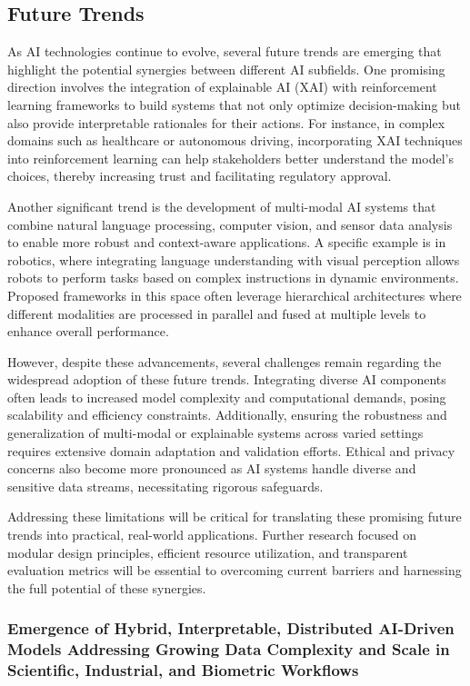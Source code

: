 \documentclass[sigconf]{acmart}
\begin{document}
\subsection{Future Trends}

As AI technologies continue to evolve, several future trends are emerging that highlight the potential synergies between different AI subfields. One promising direction involves the integration of explainable AI (XAI) with reinforcement learning frameworks to build systems that not only optimize decision-making but also provide interpretable rationales for their actions. For instance, in complex domains such as healthcare or autonomous driving, incorporating XAI techniques into reinforcement learning can help stakeholders better understand the model's choices, thereby increasing trust and facilitating regulatory approval.

Another significant trend is the development of multi-modal AI systems that combine natural language processing, computer vision, and sensor data analysis to enable more robust and context-aware applications. A specific example is in robotics, where integrating language understanding with visual perception allows robots to perform tasks based on complex instructions in dynamic environments. Proposed frameworks in this space often leverage hierarchical architectures where different modalities are processed in parallel and fused at multiple levels to enhance overall performance.

However, despite these advancements, several challenges remain regarding the widespread adoption of these future trends. Integrating diverse AI components often leads to increased model complexity and computational demands, posing scalability and efficiency constraints. Additionally, ensuring the robustness and generalization of multi-modal or explainable systems across varied settings requires extensive domain adaptation and validation efforts. Ethical and privacy concerns also become more pronounced as AI systems handle diverse and sensitive data streams, necessitating rigorous safeguards.

Addressing these limitations will be critical for translating these promising future trends into practical, real-world applications. Further research focused on modular design principles, efficient resource utilization, and transparent evaluation metrics will be essential to overcoming current barriers and harnessing the full potential of these synergies.

\subsubsection{Emergence of Hybrid, Interpretable, Distributed AI-Driven Models Addressing Growing Data Complexity and Scale in Scientific, Industrial, and Biometric Workflows}
\end{document}
